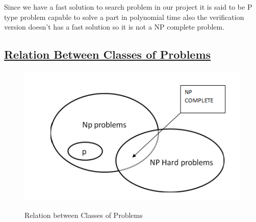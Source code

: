 \hspace{1em}Since we have a fast solution to search problem in our project it is said to be P type problem capable to solve a part in polynomial time also the verification version doesn't has a fast solution so it  is not a NP complete problem.
\subsection*{\underline{Relation Between Classes of Problems}}
 \begin{figure}[H]
    \centering
  \includegraphics[scale=0.9]{np.png}\\
  \caption{Relation between Classes of Problems}
  
\end{figure}
